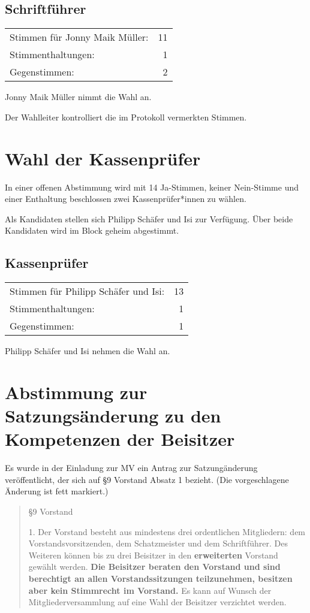 \documentclass[DIV=calc,parksip=half*]{scrartcl}
\newcommand{\fiveop}{Philipp Schäfer}
\newcommand{\jonny}{Jonny Maik Müller}
\newcommand{\isi}{Isi}
\begin{document}
\subsection{Schriftführer}
\begin{tabularx}{.9\linewidth}{Xr}
Stimmen für \jonny{}: & 11\\
Stimmenthaltungen: & 1\\
Gegenstimmen: & 2
\end{tabularx}

\jonny{} nimmt die Wahl an.

Der Wahlleiter kontrolliert die im Protokoll vermerkten Stimmen.

\section{Wahl der Kassenprüfer}

In einer offenen Abstimmung wird mit 14 Ja-Stimmen, keiner Nein-Stimme und einer Enthaltung beschlossen zwei Kassenprüfer*innen zu wählen.

Als Kandidaten stellen sich \fiveop{} und \isi{} zur Verfügung. Über beide
Kandidaten wird im Block geheim abgestimmt.

\subsection{Kassenprüfer}
\begin{tabularx}{.9\linewidth}{Xr}
Stimmen für \fiveop{} und \isi{}: & 13\\
Stimmenthaltungen: & 1\\
Gegenstimmen: & 1
\end{tabularx}

\fiveop{} und \isi{} nehmen die Wahl an.

\section{Abstimmung zur Satzungsänderung zu den Kompetenzen der Beisitzer}

Es wurde in der Einladung zur MV ein Antrag zur Satzungänderung veröffentlicht, der sich auf §9 Vorstand Absatz 1 bezieht. (Die vorgeschlagene Änderung ist fett markiert.)

\begin{quote}
§9 Vorstand

 1. Der Vorstand besteht aus mindestens drei ordentlichen Mitgliedern: dem Vorstandsvorsitzenden, dem Schatzmeister und dem Schriftführer. Des Weiteren können bis zu drei Beisitzer in den \textbf{erweiterten} Vorstand gewählt werden. \textbf{Die Beisitzer beraten den Vorstand und sind berechtigt an allen Vorstandssitzungen teilzunehmen, besitzen aber kein Stimmrecht im Vorstand.} Es kann auf Wunsch der Mitgliederversammlung auf eine Wahl der Beisitzer verzichtet werden.
\end{quote}
\end{document}
